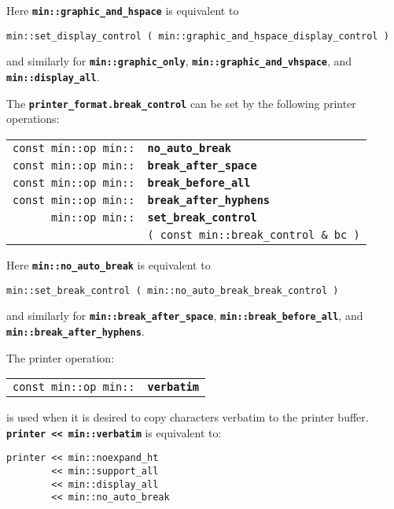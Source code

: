 \documentclass[12pt]{article}
\makeatletter
\newcommand{\TT}[1]{{\tt \bfseries #1}}
\newcommand{\ttindex}[1]{\index{#1@{\tt #1}}}
\newcommand{\EOL}{\penalty \exhyphenpenalty}
\newenvironment{indpar}[1][0.3in]%
	{\begin{list}{}%
		     {\setlength{\itemsep}{0in}%
		      \setlength{\topsep}{0in}%
		      \setlength{\parsep}{1ex}%
		      \setlength{\labelwidth}{#1}%
		      \setlength{\leftmargin}{#1}%
		      \addtolength{\leftmargin}{\labelsep}}%
	 \item}%
	{\end{list}}
\newcommand{\LABEL}[1]{\label{#1}}
\newlength{\ARGBREAKLENGTH}
\newcommand{\ARGBREAK}[1][\ARGBREAKLENGTH]{\\&\hspace*{#1}}
\newcommand{\MINKEY}[1]%
	   {\TT{#1}\ttindex{min::#1}\ttindex{#1}}
\makeatother
\begin{document}
Here \TT{min::graphic\_and\_hspace} is equivalent to
\begin{center}
\verb|min::set_display_control ( min::graphic_and_hspace_display_control )|
\end{center}
and similarly for \TT{min::\EOL graphic\_\EOL only},
\TT{min::\EOL graphic\_\EOL and\_vhspace}, and \TT{min::\EOL display\_\EOL all}.

The \TT{printer\_format.break\_control} can be set by the following
printer operations:

\begin{indpar}[1em]\begin{tabular}{r@{}l}
\verb|const min::op min::| & \MINKEY{no\_auto\_break}
\LABEL{MIN::NO_AUTO_BREAK} \\
\verb|const min::op min::| & \MINKEY{break\_after\_space}
\LABEL{MIN::BREAK_AFTER_SPACE} \\
\verb|const min::op min::| & \MINKEY{break\_before\_all}
\LABEL{MIN::BREAK_BEFORE_ALL} \\
\verb|const min::op min::| & \MINKEY{break\_after\_hyphens}
\LABEL{MIN::BREAK_AFTER_HYPHENS} \\
\verb|min::op min::|
    & \MINKEY{set\_break\_control}\ARGBREAK
          \verb|( const min::break_control & bc )|
\LABEL{MIN::SET_BREAK_CONTROL} \\
\end{tabular}\end{indpar}

Here \TT{min::no\_auto\_break} is equivalent to
\begin{center}
\verb|min::set_break_control ( min::no_auto_break_break_control )|
\end{center}
and similarly for \TT{min::break\_\EOL after\_\EOL space},
\TT{min::break\_\EOL before\_\EOL all},
and \TT{min::break\_\EOL after\_\EOL hyphens}.

The printer operation:

\begin{indpar}[1em]\begin{tabular}{r@{}l}
\verb|const min::op min::| & \MINKEY{verbatim}
\LABEL{MIN::VERBATIM} \\
\end{tabular}\end{indpar}

is used when it is desired to copy characters verbatim to the
printer buffer.  \TT{printer <{}< min::\EOL verbatim} is equivalent to:

\begin{indpar}\begin{verbatim}
printer << min::noexpand_ht
        << min::support_all
        << min::display_all
        << min::no_auto_break
\end{verbatim}\end{indpar}
\end{document}
